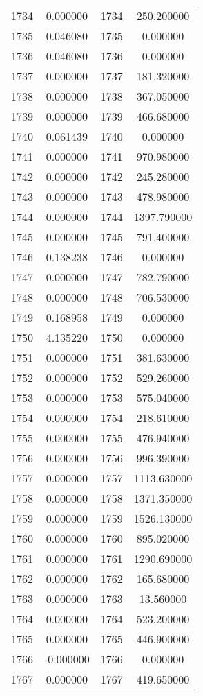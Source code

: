 \documentclass[12pt]{article}
\begin{document}
\begin{longtable}{@{}cccc@{}}
1734 & 0.000000 & 1734 & 250.200000 \\
1735 & 0.046080 & 1735 & 0.000000 \\
1736 & 0.046080 & 1736 & 0.000000 \\
1737 & 0.000000 & 1737 & 181.320000 \\
1738 & 0.000000 & 1738 & 367.050000 \\
1739 & 0.000000 & 1739 & 466.680000 \\
1740 & 0.061439 & 1740 & 0.000000 \\
1741 & 0.000000 & 1741 & 970.980000 \\
1742 & 0.000000 & 1742 & 245.280000 \\
1743 & 0.000000 & 1743 & 478.980000 \\
1744 & 0.000000 & 1744 & 1397.790000 \\
1745 & 0.000000 & 1745 & 791.400000 \\
1746 & 0.138238 & 1746 & 0.000000 \\
1747 & 0.000000 & 1747 & 782.790000 \\
1748 & 0.000000 & 1748 & 706.530000 \\
1749 & 0.168958 & 1749 & 0.000000 \\
1750 & 4.135220 & 1750 & 0.000000 \\
1751 & 0.000000 & 1751 & 381.630000 \\
1752 & 0.000000 & 1752 & 529.260000 \\
1753 & 0.000000 & 1753 & 575.040000 \\
1754 & 0.000000 & 1754 & 218.610000 \\
1755 & 0.000000 & 1755 & 476.940000 \\
1756 & 0.000000 & 1756 & 996.390000 \\
1757 & 0.000000 & 1757 & 1113.630000 \\
1758 & 0.000000 & 1758 & 1371.350000 \\
1759 & 0.000000 & 1759 & 1526.130000 \\
1760 & 0.000000 & 1760 & 895.020000 \\
1761 & 0.000000 & 1761 & 1290.690000 \\
1762 & 0.000000 & 1762 & 165.680000 \\
1763 & 0.000000 & 1763 & 13.560000 \\
1764 & 0.000000 & 1764 & 523.200000 \\
1765 & 0.000000 & 1765 & 446.900000 \\
1766 & -0.000000 & 1766 & 0.000000 \\
1767 & 0.000000 & 1767 & 419.650000 \\

\end{longtable}
\end{document}
